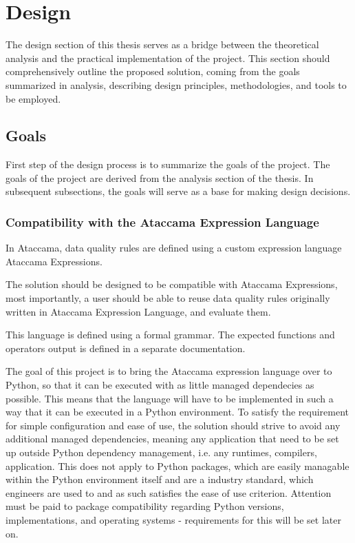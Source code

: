 
\chapter{Design}

The design section of this thesis serves as a bridge between the theoretical analysis and the practical implementation of the project. This section should comprehensively outline the proposed solution, coming from the goals summarized in analysis, describing design principles, methodologies, and tools to be employed. 

\section{Goals}

First step of the design process is to summarize the goals of the project. The goals of the project are derived from the analysis section of the thesis. In subsequent subsections, the goals will serve as a base for making design decisions. 


\subsection{Compatibility with the Ataccama Expression Language}

In Ataccama, data quality rules are defined using a custom expression language Ataccama Expressions. 

The solution should be designed to be compatible with Ataccama Expressions, most importantly, a user should be able to reuse data quality rules originally written in Ataccama Expression Language, and evaluate them.

This language is defined using a formal grammar. The expected functions and operators output is defined in a separate documentation.

The goal of this project is to bring the Ataccama expression language over to Python, so that it can be executed with as little managed dependecies as possible. This means that the language will have to be implemented in such a way that it can be executed in a Python environment. To satisfy the requirement for simple configuration and ease of use, the solution should strive to avoid any additional managed dependencies, meaning any application that need to be set up outside Python dependency management, i.e. any runtimes, compilers, application. This does not apply to Python packages, which are easily managable within the Python environment itself and are a industry standard, which engineers are used to and as such satisfies the ease of use criterion. Attention must be paid to package compatibility regarding Python versions, implementations, and operating systems - requirements for this will be set later on. 


